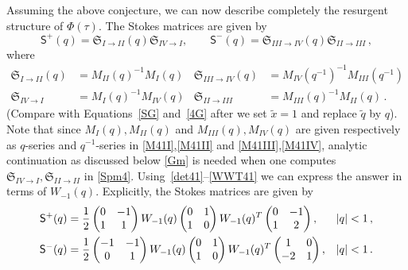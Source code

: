 \documentclass[12pt,reqno]{amsart}
\theoremstyle{definition}
\def\tq{\tilde{q}}
\def\tx{\tilde{x}}
\def\tx{\tilde{x}}
\def\mfS{\mathfrak{S}}
\def\ms{\mathsf}
\begin{document}
Assuming the above conjecture, we can now describe completely the
resurgent structure of $\Phi(\tau)$.  The Stokes matrices are given by
\begin{equation}
  \label{Spm1}
  \ms{S}^+(q)= 
  \mathfrak{S}_{I \rightarrow II}(q)
  \mfS_{IV\rightarrow I}, \qquad
  \ms{S}^-(q)= 
  \mathfrak{S}_{III \rightarrow IV}(q)
  \mfS_{II\rightarrow III}\,,
\end{equation}
%
where 
\begin{subequations}
  \begin{align}
  \label{Spm3}
    \mathfrak{S}_{I \rightarrow II}(q)
    &= M_{II}(q)^{-1} M_I(q)
    & \mathfrak{S}_{III \rightarrow IV}(q)
    &= M_{IV}(q^{-1})^{-1}
  M_{III}(q^{-1}) \\
  \label{Spm4}
    \mfS_{IV\rightarrow I}
    & = M_I(q)^{-1}M_{IV}(q)
    & \mfS_{II\rightarrow III}
    &= M_{III}(q)^{-1}M_{II}(q) \,.
\end{align}
\end{subequations}
(Compare with Equations~\eqref{SG} and~\eqref{4G} after
we set $\tx=1$ and replace $\tq$ by $q$).
Note that since $M_I(q), M_{II}(q)$ and
$M_{III}(q), M_{IV}(q)$ are given respectively as $q$-series and
$q^{-1}$-series in \eqref{M41I},\eqref{M41II} and
\eqref{M41III},\eqref{M41IV}, analytic continuation as discussed below
\eqref{Gm} is needed when one computes
$\mfS_{IV\rightarrow I},\mfS_{II\rightarrow II}$ in \eqref{Spm4}.
Using~\eqref{det41}--\eqref{WWT41} we can express the answer in terms
of $W_{-1}(q)$. Explicitly, the Stokes matrices are given by
\begin{subequations}
\begin{align}
  \label{S41p}
  \ms{S}^+(q)
  &={1\over 2} \begin{pmatrix} 0 & -1 \\ 1 & 1 \end{pmatrix}
  W_{-1}(q) \begin{pmatrix} 0 & 1 \\ 1 & 0 \end{pmatrix}W_{-1}(q)^T
  \begin{pmatrix} 0 & -1 \\ 1 & 2 \end{pmatrix}, & |q|<1\,, \\
  \label{S41m}
  \ms{S}^-(q)
  &= {1\over 2}
  \begin{pmatrix} -1 & -1 \\ 0 & 1 \end{pmatrix} W_{-1}(q)
  \begin{pmatrix} 0 & 1 \\ 1 & 0 \end{pmatrix}W_{-1}(q)^T
  \begin{pmatrix} 1 & 0 \\ -2 & 1 \end{pmatrix}, & |q|<1 \,.
\end{align}
\end{subequations}
\end{document}
